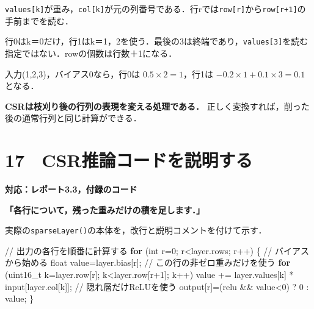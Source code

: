 \documentclass[
  14pt,
  a5paper,
]{extarticle}
\newenvironment{Shaded}{}{}
\newcommand{\CommentTok}[1]{\textcolor[rgb]{0.38,0.63,0.69}{\textit{#1}}}
\newcommand{\ControlFlowTok}[1]{\textcolor[rgb]{0.00,0.44,0.13}{\textbf{#1}}}
\newcommand{\DataTypeTok}[1]{\textcolor[rgb]{0.56,0.13,0.00}{#1}}
\newcommand{\DecValTok}[1]{\textcolor[rgb]{0.25,0.63,0.44}{#1}}
\newcommand{\NormalTok}[1]{#1}
\newcommand{\OperatorTok}[1]{\textcolor[rgb]{0.40,0.40,0.40}{#1}}
\renewcommand{\CommentTok}[1]{\textcolor[rgb]{0.25,0.25,0.25}{#1}}
\begin{document}
\texttt{values{[}k{]}}が重み，\texttt{col{[}k{]}}が元の列番号である．行rでは\texttt{row{[}r{]}}から\texttt{row{[}r+1{]}}の手前までを読む．

行0はk＝0だけ，行1はk＝1，2を使う．最後の3は終端であり，\texttt{values{[}3{]}}を読む指定ではない．rowの個数は行数＋1になる．

入力(1,2,3)，バイアス0なら，行0は \(0.5\times2=1\)，行1は
\(-0.2\times1+0.1\times3=0.1\) となる．

\textbf{CSRは枝刈り後の行列の表現を変える処理である．}
正しく変換すれば，削った後の通常行列と同じ計算ができる．

\newpage

\section{17　CSR推論コードを説明する}\label{csrux63a8ux8ad6ux30b3ux30fcux30c9ux3092ux8aacux660eux3059ux308b}

\textbf{対応：レポート3.3，付録のコード}

\textbf{「各行について，残った重みだけの積を足します．」}

実際の\texttt{sparseLayer()}の本体を，改行と説明コメントを付けて示す．

\begin{Shaded}
\begin{Highlighting}[]
\CommentTok{// 出力の各行を順番に計算する}
\ControlFlowTok{for} \OperatorTok{(}\DataTypeTok{int}\NormalTok{ r}\OperatorTok{=}\DecValTok{0}\OperatorTok{;}\NormalTok{ r}\OperatorTok{\textless{}}\NormalTok{layer}\OperatorTok{.}\NormalTok{rows}\OperatorTok{;}\NormalTok{ r}\OperatorTok{++)} \OperatorTok{\{}
  \CommentTok{// バイアスから始める}
  \DataTypeTok{float}\NormalTok{ value}\OperatorTok{=}\NormalTok{layer}\OperatorTok{.}\NormalTok{bias}\OperatorTok{[}\NormalTok{r}\OperatorTok{];}
  \CommentTok{// この行の非ゼロ重みだけを使う}
  \ControlFlowTok{for} \OperatorTok{(}\DataTypeTok{uint16\_t}\NormalTok{ k}\OperatorTok{=}\NormalTok{layer}\OperatorTok{.}\NormalTok{row}\OperatorTok{[}\NormalTok{r}\OperatorTok{];}
\NormalTok{       k}\OperatorTok{\textless{}}\NormalTok{layer}\OperatorTok{.}\NormalTok{row}\OperatorTok{[}\NormalTok{r}\OperatorTok{+}\DecValTok{1}\OperatorTok{];}\NormalTok{ k}\OperatorTok{++)}
\NormalTok{    value }\OperatorTok{+=}\NormalTok{ layer}\OperatorTok{.}\NormalTok{values}\OperatorTok{[}\NormalTok{k}\OperatorTok{]}
           \OperatorTok{*}\NormalTok{ input}\OperatorTok{[}\NormalTok{layer}\OperatorTok{.}\NormalTok{col}\OperatorTok{[}\NormalTok{k}\OperatorTok{]];}
  \CommentTok{// 隠れ層だけReLUを使う}
\NormalTok{  output}\OperatorTok{[}\NormalTok{r}\OperatorTok{]=(}\NormalTok{relu }\OperatorTok{\&\&}\NormalTok{ value}\OperatorTok{\textless{}}\DecValTok{0}\OperatorTok{)}
          \OperatorTok{?} \DecValTok{0} \OperatorTok{:}\NormalTok{ value}\OperatorTok{;}
\OperatorTok{\}}
\end{Highlighting}
\end{Shaded}
\end{document}
